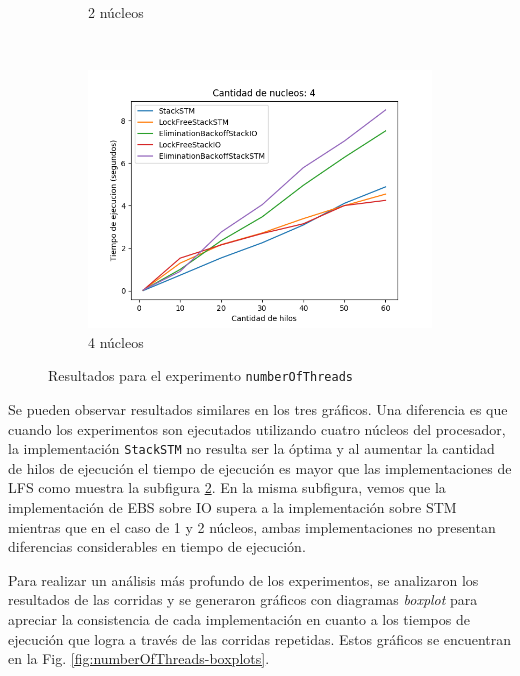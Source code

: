 \begin{figure}[t]
\begin{subfigure}[b]{0.49\textwidth}
        \caption{2 núcleos}
        \label{subfig:numberOfThreads-2core}
    \end{subfigure}
    ~
    \begin{subfigure}[b]{0.5\textwidth}
        \includegraphics[width=\textwidth]{images/numberOfThreads/plots/4.png}
        \caption{4 núcleos}
        \label{subfig:numberOfThreads-4core}
    \end{subfigure}
    \caption{Resultados para el experimento \texttt{numberOfThreads}}
    \label{fig:numberOfThreads-all}
\end{figure}

Se pueden observar resultados similares en los tres gráficos. Una diferencia es que cuando los experimentos son ejecutados utilizando cuatro núcleos del procesador, la implementación \texttt{StackSTM} no resulta ser la óptima y al aumentar la cantidad de hilos de ejecución el tiempo de ejecución es mayor que las implementaciones de LFS como muestra la subfigura \ref{subfig:numberOfThreads-4core}.
En la misma subfigura, vemos que la implementación de EBS sobre IO supera a la implementación sobre STM mientras que en el caso de 1 y 2 núcleos, ambas implementaciones no presentan diferencias considerables en tiempo de ejecución.

Para realizar un análisis más profundo de los experimentos, se analizaron los resultados de las corridas y se generaron gráficos con diagramas \emph{boxplot} para apreciar la consistencia de cada implementación en cuanto a los tiempos de ejecución que logra a través de las corridas repetidas. Estos gráficos se encuentran en la Fig. \ref{fig:numberOfThreads-boxplots}.

